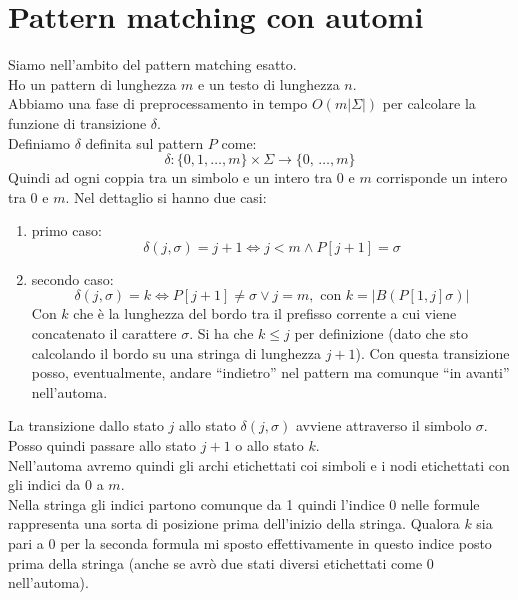 \documentclass[a4paper,12pt, oneside]{book}
\begin{document}
\section{Pattern matching con automi}
Siamo nell'ambito del pattern matching esatto.\\
Ho un pattern di lunghezza $m$ e un testo di lunghezza $n$.\\
Abbiamo una fase di preprocessamento in tempo $O(m|\Sigma|)$ per calcolare la
funzione di transizione $\delta$.\\
Definiamo $\delta$ definita sul pattern $P$ come:
\[\delta:\{0,1,\ldots, m\}\times \Sigma\to\{0,\,\ldots, m\}\]
Quindi ad ogni coppia tra un simbolo e un intero tra 0 e $m$ corrisponde un
intero tra 0 e $m$. Nel dettaglio si hanno due casi:
\begin{enumerate}
  \item primo caso:
  \[\delta(j,\sigma)=j+1\iff j<m\land P[j+1]=\sigma\]

  \item secondo caso:
  \[\delta(j,\sigma)=k\iff P[j+1]\neq \sigma \lor j=m,\mbox{ con
    }k=|B(P[1,j]\sigma)|\]
  Con $k$ che è la lunghezza del bordo tra il prefisso corrente a cui viene
  concatenato il carattere $\sigma$. Si ha che $k\leq j$ per definizione (dato
  che sto calcolando il bordo su una stringa di lunghezza $j+1$). Con questa 
  transizione posso, eventualmente, andare ``indietro'' nel pattern ma comunque
  ``in avanti'' nell'automa.
\end{enumerate}
La transizione dallo stato $j$ allo stato $\delta(j,\sigma)$ avviene attraverso
il simbolo $\sigma$. Posso quindi passare allo stato $j+1$ o allo stato $k$.\\
Nell'automa avremo quindi gli archi etichettati coi simboli e i nodi
etichettati con gli indici da 0 a $m$.\\
Nella stringa gli indici partono comunque da 1 quindi l'indice 0 nelle formule
rappresenta una sorta di posizione prima dell'inizio della stringa. Qualora $k$
sia pari a 0 per la seconda formula mi sposto effettivamente in questo indice
posto prima della stringa (anche se avrò due stati diversi etichettati come 0
nell'automa).
\end{document}
